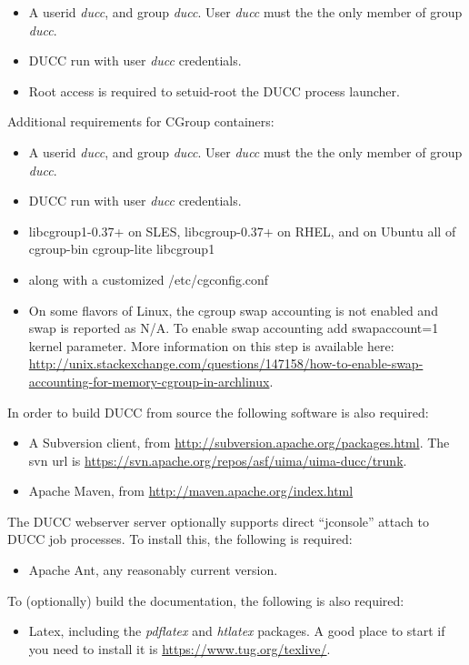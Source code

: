 \begin{itemize}
  \item A userid {\em ducc}, and group {\em ducc}.  User {\em ducc} must the the only member of group {\em ducc}.
  \item DUCC run with user {\em ducc} credentials.
  \item Root access is required to setuid-root the DUCC process launcher.
\end{itemize}
  
Additional requirements for CGroup containers:

\begin{itemize}
  \item A userid {\em ducc}, and group {\em ducc}.  User {\em ducc} must the the only member of group {\em ducc}.
  \item DUCC run with user {\em ducc} credentials.
  \item libcgroup1-0.37+ on SLES, libcgroup-0.37+ on RHEL, and on Ubuntu all of cgroup-bin cgroup-lite libcgroup1
  \item along with a customized /etc/cgconfig.conf
  \item On some flavors of Linux, the cgroup swap accounting is not enabled and swap is reported as N/A. To enable swap accounting add swapaccount=1 kernel parameter. More information on this step is available here: \url{http://unix.stackexchange.com/questions/147158/how-to-enable-swap-accounting-for-memory-cgroup-in-archlinux}.  
\end{itemize}

  
In order to build DUCC from source the following software is also required:
\begin{itemize}
    \item A Subversion client, from \url{http://subversion.apache.org/packages.html}.  The
      svn url is \url{https://svn.apache.org/repos/asf/uima/uima-ducc/trunk}.
    \item Apache Maven, from \url{http://maven.apache.org/index.html}
\end{itemize}

The DUCC webserver server optionally supports direct ``jconsole'' attach to DUCC job processes.  To install
this, the following is required:
\begin{itemize}
    \item Apache Ant, any reasonably current version.
\end{itemize}
    
To (optionally) build the documentation, the following is also required:
\begin{itemize}
  \item Latex, including the \emph{pdflatex} and \emph{htlatex} packages.  A good place
    to start if you need to install it is \url{https://www.tug.org/texlive/}.
\end{itemize}

